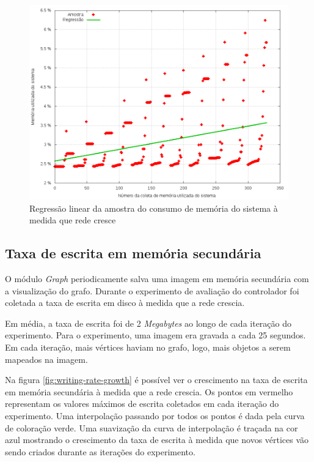 \begin{figure}[!htb]
    \centering
    \label{fig:scatter-memory-usage}
    \includegraphics[width=\linewidth]{img/scatter-memory-usage}
    \caption{Regressão linear da amostra do consumo de memória do sistema
    à medida que rede cresce}
\end{figure}


\subsection{Taxa de escrita em memória secundária}

O módulo \emph{Graph} periodicamente salva uma imagem em memória secundária
com a visualização do grafo.
Durante o experimento de avaliação do controlador foi coletada a taxa de
escrita em disco à medida que a rede crescia. 

Em média, a taxa de escrita foi de 2 \emph{Megabytes} ao longo de cada 
iteração do experimento.
Para o experimento, uma imagem era gravada a cada 25 segundos.
Em cada iteração, mais vértices haviam no grafo, logo, mais objetos a serem 
mapeados na imagem. 

\break

Na figura \ref{fig:writing-rate-growth} é possível ver o crescimento na 
taxa de escrita em memória secundária à medida que a rede crescia.
Os pontos em vermelho representam os valores máximos de escrita coletados 
em cada iteração do experimento.
Uma interpolação passando por todos os pontos é dada pela curva de coloração
verde.
Uma suavização da curva de interpolação é traçada na cor azul mostrando 
o crescimento da taxa de escrita à medida que novos vértices vão sendo criados
durante as iterações do experimento.

